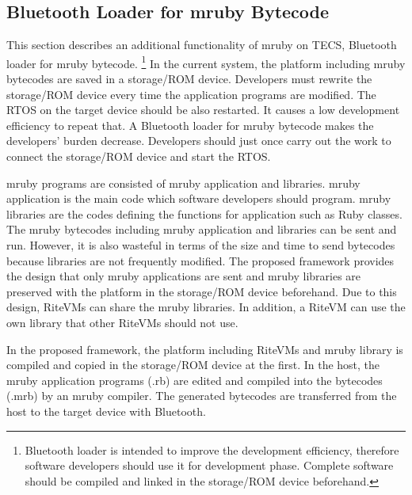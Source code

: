 \documentclass{sig-alternate-05-2015}
\begin{document}
\subsection{Bluetooth Loader for mruby Bytecode}
\label{sec:Bluetooth loader for mruby bytecode}
This section describes an additional functionality of mruby on TECS, Bluetooth loader for mruby bytecode.
\footnote{
Bluetooth loader is intended to improve the development efficiency, therefore software developers should use it for development phase.
Complete software should be compiled and linked in the storage/ROM device beforehand.
}
In the current system, the platform including mruby bytecodes are saved in a storage/ROM device.
Developers must rewrite the storage/ROM device every time the application programs are modified.
The RTOS on the target device should be also restarted.
It causes a low development efficiency to repeat that.
A Bluetooth loader for mruby bytecode makes the developers' burden decrease.
Developers should just once carry out the work to connect the storage/ROM device and start the RTOS. 

mruby programs are consisted of mruby application and libraries.
mruby application is the main code which software developers should program.
mruby libraries are the codes defining the functions for application such as Ruby classes. 
The mruby bytecodes including mruby application and libraries can be sent and run.
However, it is also wasteful in terms of the size and time to send bytecodes because libraries are not frequently modified. 
The proposed framework provides the design that only mruby applications are sent and mruby libraries are preserved with the platform in the storage/ROM device beforehand.
Due to this design, RiteVMs can share the mruby libraries.
In addition, a RiteVM can use the own library that other RiteVMs should not use.

In the proposed framework, the platform including RiteVMs and mruby library is compiled and copied in the storage/ROM device at the first.
In the host, the mruby application programs (.rb) are edited and compiled into the bytecodes (.mrb) by an mruby compiler.
The generated bytecodes are transferred from the host to the target device with Bluetooth.
\end{document}

